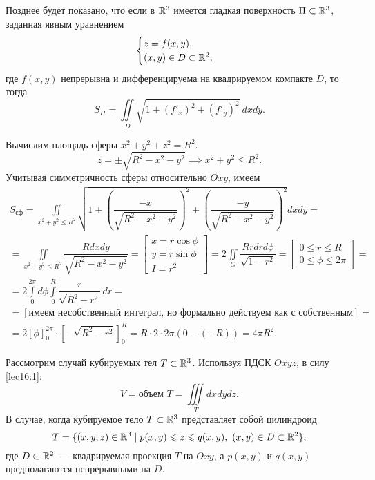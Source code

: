 \documentclass[../../main.tex]{subfiles}
\begin{document}
Позднее будет показано, что если в $\mathbb{R}^{3}$ имеется гладкая поверхность
$\Pi\subset \mathbb{R}^3$, заданная явным уравнением 
\begin{equation*}
\begin{cases}
z = f(x, y),\\
(x, y) \in D \subset \mathbb{R}^{2},
\end{cases}
\end{equation*} 
где $f(x, y)$
непрерывна и дифференцируема на квадрируемом компакте $D$, то тогда
\begin{equation}
\label{lec16:9}
S_\Pi = \iint\limits_D\sqrt{1 + (f'_x)^2 + (f'_y)^2}\:dxdy.
\end{equation}
\begin{example}
	Вычислим площадь сферы $x^2+y^2+z^2=R^2$.
\begin{equation*}
	z=\pm\sqrt{R^2-x^2-y^2}\implies 
	x^2+y^2\leq R^2.
\end{equation*}	
Учитывая симметричность сферы относительно $Oxy$, имеем
\begin{gather*}
S_{\text{сф}}=\iint\limits_{x^2+y^2 \leq R^2}
\sqrt{
1+\left(\dfrac{-x}{\sqrt
	{
		R^2-x^2-y^2
	}}
\right)^2
+
\left(
\dfrac{-y}
{\sqrt{R^2-x^2-y^2}}\right)^2
}dxdy
=\\
=
\iint\limits_{x^2+y^2\leq R^2}
\dfrac{Rdxdy}{\sqrt{R^2-x^2-y^2}}
=
\left[
\begin{gathered}
x=r\cos \phi\\
y=r\sin \phi\\
I=r^2
\end{gathered}
\right]
=
2\iint\limits_{G}
\dfrac{Rrdrd\phi}
{\sqrt{1-r^2}}
=
\left[
\begin{gathered}
0\leq r \leq R\\
0\leq \phi \leq 2 \pi
\end{gathered}
\right]=\\
=
2\int\limits_0^{2\pi}d\phi\int\limits_0^{R}
\dfrac{r}{\sqrt{R^2-r^2}}\,dr=
\\ =[
\text{имеем несобственный интеграл, но формально действуем как с собственным}
]= \\ =
2\left[\phi\right]^{2\pi}_0\cdot
\left[
-\sqrt{R^2-r^2}
\right]^R_0
=
R\cdot2\cdot2\pi(0-(-R))=4\pi R^2.
\end{gather*}
\end{example}
Рассмотрим случай кубируемых тел $T\subset \mathbb{R}^3$. Используя ПДСК $Oxyz$, в 
силу 
\eqref{lec16:1}:
\begin{equation}
\label{lec16:10}
V=\text{объем }T=\iiint\limits_T dxdydz.
\end{equation}
В случае, когда кубируемое тело $T\subset \mathbb{R}^3$ представляет собой цилиндроид
\begin{equation*}
T=\{
(x,y,z)\in\mathbb{R}^3 \mid 
p(x,y)\leqslant z \leqslant q(x,y),\ (x,y)\in D\subset \mathbb{R}^2
\},
\end{equation*}
где $D\subset \mathbb{R}^2$~--- квадрируемая проекция $T$ на $Oxy$, а $p(x,y)$ и 
$q(x,y)$ предполагаются непрерывными на $D$.
\end{document}
